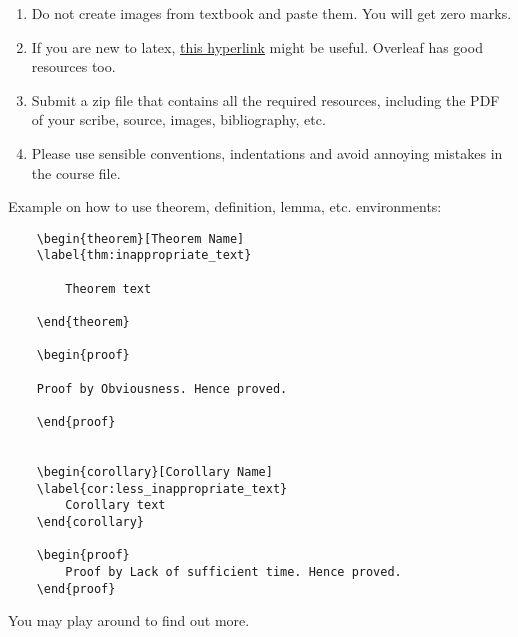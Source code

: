 \documentclass[11.5pt, paper=a4]{article}
\theoremstyle{definition}
\newtheorem{theorem}{Theorem}[section]
\newtheorem{corollary}[theorem]{Corollary}
\numberwithin{theorem}{section}
\begin{document}
\begin{enumerate}
\item Do not create images from textbook and paste them. You will get zero marks.

\item If you are new to latex, \href{https://en.wikibooks.org/wiki/LaTeX/Mathematics}{this hyperlink} might be useful. Overleaf has good resources too.

\item Submit a zip file that contains all the required resources, including the PDF of your scribe, source, images, bibliography, etc.

\item Please use sensible conventions, indentations and avoid annoying mistakes in the course file. 

\end{enumerate}

Example on how to use theorem, definition, lemma, etc. environments:

\begin{verbatim}
    \begin{theorem}[Theorem Name]
    \label{thm:inappropriate_text}

        Theorem text

    \end{theorem}

    \begin{proof}

    Proof by Obviousness. Hence proved. 
    
    \end{proof}


    \begin{corollary}[Corollary Name]
    \label{cor:less_inappropriate_text}
        Corollary text
    \end{corollary}
    
    \begin{proof}
        Proof by Lack of sufficient time. Hence proved.
    \end{proof}

\end{verbatim}

You may play around to find out more.



\end{document}
